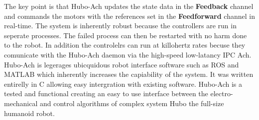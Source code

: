 The key point is that Hubo-Ach updates the state data in the \textbf{Feedback} channel and commands the motors with the references set in the \textbf{Feedforward} channel in real-time.  
The system is inherently robust because the controllers are run in seperate processes.
The failed process can then be restarted with no harm done to the robot.
In addition the controlelrs can run at killohertz rates becuse they comunicate with the Hubo-Ach daemon via the high-speed low-latancy IPC Ach.
Hubo-Ach is legerages ubicquidous robot interface software such as ROS and MATLAB which inherently increases the capiability of the system.
It was written entirelly in C allowing easy intergration with existing software.
Hubo-Ach is a tested and functional creating an easy to use interface between the electro-mechanical and control algorithms of complex system Hubo the full-size humanoid robot.
